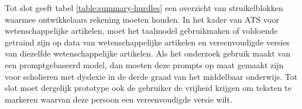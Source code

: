 \medspace

Tot slot geeft tabel \ref{table:summary-hurdles} een overzicht van struikelblokken waarmee ontwikkelaars rekening moeten houden. In het kader van ATS voor wetenschappelijke artikelen, moet het taalmodel gebruikmaken of voldoende getraind zijn op data van wetenschappelijke artikelen en vereenvoudigde versies van diezelfde wetenschappelijke artikelen. Als het onderzoek gebruik maakt van een promptgebaseerd model, dan moeten deze prompts op maat gemaakt zijn voor scholieren met dyslexie in de derde graad van het middelbaar onderwijs. Tot slot moet dergelijk prototype ook de gebruiker de vrijheid krijgen om teksten te markeren waarvan deze persoon een vereenvoudigde versie wilt.
